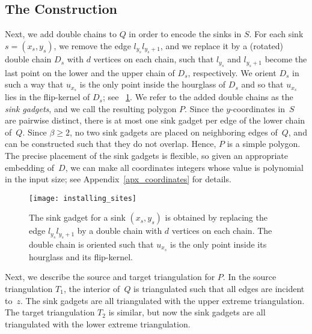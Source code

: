\documentclass[a4paper,11pt]{article}
\begin{document}
\subsection{The Construction}
\label{sec_construction}
Next, we add double chains to $Q$ in order to encode the sinks in $S$.
For each sink $s = (x_s,y_s)$, we remove the edge $l_{y_s} l_{y_s + 1}$, and we replace it by a (rotated) double chain $D_s$ with $d$ vertices on each chain, such that $l_{y_s}$ and $l_{y_s+1}$ become the last point on the lower and the upper chain of $D_s$, respectively.
We orient $D_s$ in such a way that $u_{x_s}$ is the only point inside the hourglass of $D_s$ and so that $u_{x_s}$ lies in the flip-kernel of $D_s$; see \figurename~\ref{fig_installing_sites}.
We refer to the added double chains as the \emph{sink gadgets}, and
we call the resulting polygon $P$.
Since the $y$-coordinates in~$S$ are pairwise distinct, there is at most one sink gadget per edge of the lower chain of~$Q$.
Since $\beta \geq 2$, no two sink gadgets are placed on neighboring edges of~$Q$, and can be constructed such that they do not overlap.
Hence, $P$ is a simple polygon.
The precise placement of the sink gadgets is flexible, so given an appropriate embedding of~$D$, we can make all coordinates integers whose value is polynomial in the input size;
see Appendix~\ref{apx_coordinates} for details.

\begin{figure}
\centering
\texttt{[image: installing\_sites]}
\caption{
The sink gadget for a sink $(x_s,y_s)$ is obtained by replacing the edge
$l_{y_s} l_{y_s + 1}$ by a double chain with $d$ vertices on
each chain. The double chain is oriented such that $u_{x_s}$ is the
only point inside its hourglass and its flip-kernel. }
\label{fig_installing_sites}
\end{figure}

Next, we describe the source and target triangulation for $P$.
In the source triangulation $T_1$, the interior of~$Q$ is triangulated 
such that all edges are incident to~$z$. 
The sink gadgets are all triangulated with the upper extreme triangulation.
The target triangulation $T_2$ is similar, but now the sink gadgets 
are all triangulated with the lower extreme triangulation.
\end{document}

